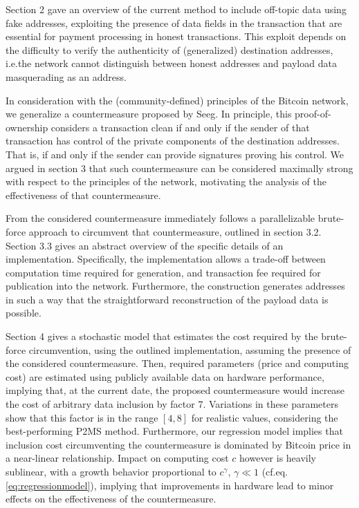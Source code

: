 \documentclass[a4paper,11pt,titlepage]{scrbook}
\begin{document}
Section 2 gave an overview of the current method to include off-topic data using fake addresses, exploiting the presence of data fields in the transaction that are essential for payment processing in honest transactions.
This exploit depends on the difficulty to verify the authenticity of (generalized) destination addresses, i.e.\@ the network cannot distinguish between honest addresses and payload data masquerading as an address.

In consideration with the (community-defined) principles of the Bitcoin network, we generalize a countermeasure proposed by Seeg.
In principle, this proof-of-ownership considers a transaction clean if and only if the sender of that transaction has control of the private components of the destination addresses.
That is, if and only if the sender can provide signatures proving his control.
We argued in section 3 that such countermeasure can be considered maximally strong with respect to the principles of the network, motivating the analysis of the effectiveness of that countermeasure.

From the considered countermeasure immediately follows a parallelizable brute-force approach to circumvent that countermeasure, outlined in section 3.2. Section 3.3 gives an abstract overview of the specific details of an implementation.
Specifically, the implementation allows a trade-off between computation time required for generation, and transaction fee required for publication into the network.
Furthermore, the construction generates addresses in such a way that the straightforward reconstruction of the payload data is possible.

Section 4 gives a stochastic model that estimates the cost required by the brute-force circumvention, using the outlined implementation, assuming the presence of the considered countermeasure.
Then, required parameters (price and computing cost) are estimated using publicly available data on hardware performance, implying that, at the current date, the proposed countermeasure would increase the cost of arbitrary data inclusion by factor 7.
Variations in these parameters show that this factor is in the range $[4, 8]$ for realistic values, considering the best-performing P2MS method.
Furthermore, our regression model implies that inclusion cost circumventing the countermeasure is dominated by Bitcoin price in a near-linear relationship.
Impact on computing cost $c$ however is heavily sublinear, with a growth behavior proportional to $c^\gamma$, $\gamma \ll 1$ (cf.\@ eq.\@ \ref{eq:regressionmodel}), implying that improvements in hardware lead to minor effects on the effectiveness of the countermeasure.
\end{document}
